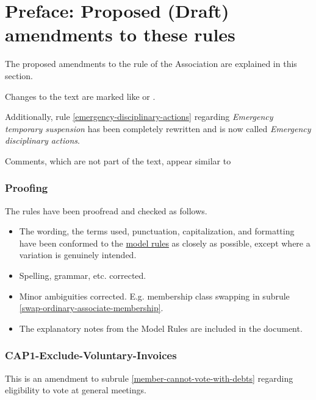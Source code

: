 \documentclass[../constitution.tex]{subfiles}
\begin{document}
\part*{Preface: Proposed (Draft) amendments to these rules}


The proposed amendments to the rule of the Association are explained in this section.

Changes to the text are marked like  or .

Additionally, rule \ref{emergency-disciplinary-actions} regarding \textit{Emergency temporary suspension} has been completely rewritten and is now called \textit{Emergency disciplinary actions}.

Comments, which are not part of the text, appear similar to 

\section*{Proofing}

The rules have been proofread and checked as follows.

\begin{itemize}
    \item The wording, the terms used, punctuation, capitalization, and formatting have been conformed to the \href{https://www.commerce.wa.gov.au/consumer-protection/model-rules}{model rules} as closely as possible, except where a variation is genuinely intended.
    \item Spelling, grammar, etc. corrected.
    \item Minor ambiguities corrected. E.g. membership class swapping in subrule \ref{swap-ordinary-associate-membership}.
    \item The explanatory notes from the Model Rules are included in the document.
\end{itemize}

\section*{CAP1-Exclude-Voluntary-Invoices}

This is an amendment to subrule \ref{member-cannot-vote-with-debts} regarding eligibility to vote at general meetings.
\end{document}
